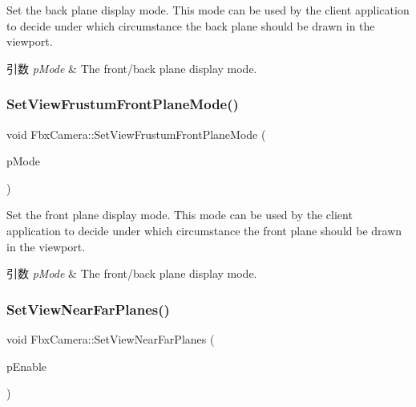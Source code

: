 Set the back plane display mode. This mode can be used by the client application to decide under which circumstance the back plane should be drawn in the viewport. 
\begin{DoxyParams}{引数}
{\em p\+Mode} & The front/back plane display mode. \\
\hline
\end{DoxyParams}
\mbox{\label{class_fbx_camera_a004e8efe0afd8f7e688d7cd6c488b9e2}} 
\subsubsection{\texorpdfstring{Set\+View\+Frustum\+Front\+Plane\+Mode()}{SetViewFrustumFrontPlaneMode()}}
{\footnotesize\ttfamily void Fbx\+Camera\+::\+Set\+View\+Frustum\+Front\+Plane\+Mode (\begin{DoxyParamCaption}\item[{\hyperlink{class_fbx_camera_ab7b9d3e546552049a79261a444f9b44a}{E\+Front\+Back\+Plane\+Display\+Mode}}]{p\+Mode }\end{DoxyParamCaption})}

Set the front plane display mode. This mode can be used by the client application to decide under which circumstance the front plane should be drawn in the viewport. 
\begin{DoxyParams}{引数}
{\em p\+Mode} & The front/back plane display mode. \\
\hline
\end{DoxyParams}
\mbox{\label{class_fbx_camera_a1e12b34c16548903eef5e2863127510f}} 
\subsubsection{\texorpdfstring{Set\+View\+Near\+Far\+Planes()}{SetViewNearFarPlanes()}}
{\footnotesize\ttfamily void Fbx\+Camera\+::\+Set\+View\+Near\+Far\+Planes (\begin{DoxyParamCaption}\item[{bool}]{p\+Enable }\end{DoxyParamCaption})}

